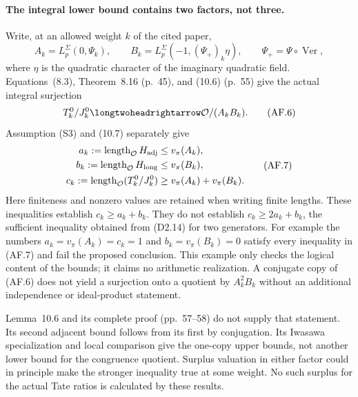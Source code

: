 \paragraph{The integral lower bound contains two factors, not three.}
Write, at an allowed weight $k$ of the cited paper,
\[
 A_k=L_p^\Sigma(0,\Psi_k),\qquad
 B_k=L_p^\Sigma(-1,(\Psi_+)_k\eta),\qquad
 \Psi_+=\Psi\circ\operatorname{Ver},                         \tag{AF.5}
\]
where $\eta$ is the quadratic character of the imaginary quadratic
field.  Equations~(8.3), Theorem~8.16 (p.~45), and (10.6) (p.~55)
give the actual integral surjection
\[
 T^0_k/J^0_k\longtwoheadrightarrow\mathcal O/(A_kB_k).        \tag{AF.6}
\]
Assumption (S3) and (10.7) separately give
\[
 \begin{aligned}
 a_k:=\operatorname{length}_{\mathcal O}H_{\rm adj}
       &\leq v_\pi(A_k),\\
 b_k:=\operatorname{length}_{\mathcal O}H_{\rm long}
       &\leq v_\pi(B_k),\\
 c_k:=\operatorname{length}_{\mathcal O}(T^0_k/J^0_k)
       &\geq v_\pi(A_k)+v_\pi(B_k).
 \end{aligned}                                               \tag{AF.7}
\]
Here finiteness and nonzero values are retained when writing finite
lengths.  These inequalities establish $c_k\geq a_k+b_k$.
They do not establish $c_k\geq2a_k+b_k$, the sufficient inequality
obtained from (D2.14) for two generators.  For example the numbers
$a_k=v_\pi(A_k)=c_k=1$ and $b_k=v_\pi(B_k)=0$ satisfy every
inequality in (AF.7) and fail the proposed conclusion.  This example
only checks the logical content of the bounds; it claims no arithmetic
realization.  A conjugate copy of (AF.6) does not yield a surjection
onto a quotient by $A_k^2B_k$ without an additional independence or
ideal-product statement.

Lemma~10.6 and its complete proof (pp.~57--58) do not supply that
statement.  Its second adjacent bound follows from its first by
conjugation.  Its Iwasawa specialization and local comparison give
the one-copy upper bounds, not another lower bound for the congruence
quotient.  Surplus valuation in either factor could in principle make
the stronger inequality true at some weight.  No such surplus for the
actual Tate ratios is calculated by these results.


